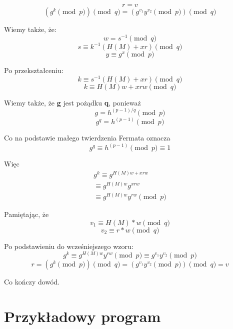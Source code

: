 \documentclass[11pt]{article}
\begin{document}
\begin{equation*}
  r = v
\end{equation*}
\begin{equation*}
  (g^{k} \pmod p) \pmod q = (g^{v_{1}}y^{v_{2}} \pmod p) \pmod q
\end{equation*}

Wiemy także, że:
\begin{equation*}
  w = s^{-1} \pmod q
\end{equation*}
\begin{equation*}
  s \equiv k^{-1}(H(M) + xr) \pmod q
\end{equation*}
\begin{equation*}
  y \equiv g^{x} \pmod p
\end{equation*}

Po przekształceniu:
\begin{equation*}
  k \equiv s^{-1}(H(M) + xr) \pmod q
\end{equation*}
\begin{equation*}
  k \equiv H(M)w + xrw \pmod q
\end{equation*}

Wiemy także, że \textbf{g} jest pożądku \textbf{q}, ponieważ
\begin{equation*}
    g = h^{(p-1)/q} \pmod p
\end{equation*}
\begin{equation*}
    g^q = h^{(p-1)} \pmod p
\end{equation*}

Co na podstawie małego twierdzenia Fermata oznacza
\begin{equation*}
    g^q \equiv h^{(p-1)} \pmod p \equiv 1
\end{equation*}

Więc
\begin{equation*}
  \begin{aligned}
    g^{k} \equiv g^{H(M)w + xrw} \\ \equiv g^{H(M)w} g^{xrw} \\ \equiv g^{H(M)w} y^{rw} \pmod p
  \end{aligned}
\end{equation*}

Pamiętając, że
\begin{equation*}
  v_{1} \equiv H(M) * w \pmod q
\end{equation*}
\begin{equation*}
  v_{2} \equiv r * w \pmod q
\end{equation*}

Po podstawieniu do wcześniejszego wzoru:
\begin{equation*}
  g^{k} \equiv g^{H(M)w} y^{rw} \pmod p \equiv g^{v_1}y^{v_2} \pmod p
\end{equation*}
\begin{equation*}
    r = (g^{k} \pmod p) \pmod q = (g^{v_{1}}y^{v_{2}} \pmod p) \pmod q = v
\end{equation*}

Co kończy dowód.

\pagebreak

\section{Przykładowy program}
\end{document}
